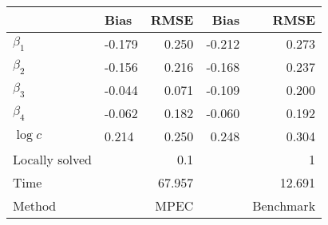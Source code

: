 
\begin{tabular}[t]{llrrr}
\toprule
  & Bias & RMSE & Bias & RMSE\\
\midrule
$\beta_{1}$ & -0.179 & 0.250 & -0.212 & 0.273\\
$\beta_{2}$ & -0.156 & 0.216 & -0.168 & 0.237\\
$\beta_{3}$ & -0.044 & 0.071 & -0.109 & 0.200\\
$\beta_{4}$ & -0.062 & 0.182 & -0.060 & 0.192\\
$\log c$ & 0.214 & 0.250 & 0.248 & 0.304\\
Locally solved &  & 0.1 &  & 1\\
Time &  & 67.957 &  & 12.691\\
Method &  & MPEC &  & Benchmark\\
\bottomrule
\end{tabular}
